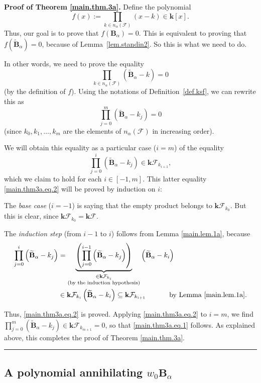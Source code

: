 \documentclass[12pt]{article}
\theoremstyle{definition}%
\theoremstyle{definition}%
\theoremstyle{remark}%
\newcommand{\tup}[1]{\left( #1 \right)}
\newcommand{\sbr}[1]{\left[ #1 \right]} %
\newcommand{\interval}[1]{\left[ #1 \right]} %
\newcommand{\kk}{\mathbf{k}}
\newcommand{\kf}{\kk\mathcal{F}}
\newcommand{\BBa}{\mathbf{B}_{\alpha}}
\newcommand{\BBta}{\widetilde{\mathbf{B}}_{\alpha}}
\newcommand{\CF}{\mathcal{F}}
\newcommand{\wo}{w_0} %
\newcommand{\na}{n_{ \alpha } }%
\newenvironment{proof}[1][Proof]{\noindent\textbf{#1.} }{\ \rule{0.5em}{0.5em}}
\begin{document}
\begin{proof}[Proof of Theorem \ref{main.thm.3a}]
Define the polynomial
\[
f\tup{x}
:= \prod_{k \in \na\tup{\CF}} \tup{x - k}
\in \kk\sbr{x}.
\]
Thus, our goal is to prove that $f\tup{\BBa} = 0$.
This is
equivalent to proving that $f\tup{\BBta} = 0$,
because of Lemma~\ref{lem.standin2}.
So this is what we need to do.

In other words, we need to prove the equality
\[
\prod_{k \in \na\tup{\CF}} \tup{\BBta - k} = 0
\]
(by the definition of $f$).
Using the notations of Definition~\ref{def.ksf}, we can rewrite this as
\begin{equation}
\prod_{j=0}^{m}
\tup{ \BBta-k_{j} }
= 0
\label{main.thm3a.eq.1}
\end{equation}
(since $k_0, k_1, \ldots, k_m$ are the elements of $\na\tup{\CF}$ in increasing order).

We will obtain this equality as a particular case ($i=m$) of the equality
\begin{equation}
\prod_{j=0}^{i} \tup{\BBta - k_j}
\in \kf_{k_{i+1}},
\label{main.thm3a.eq.2}
\end{equation}
which we claim to hold for each $i\in \interval{-1,m}$.
This latter equality \eqref{main.thm3a.eq.2} will be proved by induction
on $i$:

The \textit{base case} ($i=-1$) is saying that the
empty product belongs to $\kf_{k_0}$. But this is clear,
since $\kf_{k_0} = \kf$.

The \textit{induction step} (from $i-1$ to $i$) follows from Lemma
\ref{main.lem.1a}, because
\begin{align*}
\prod_{j=0}^{i} \tup{\BBta - k_j}
& = \underbrace{\tup{ \prod_{j=0}^{i-1}
\tup{ \BBta - k_j } }  }_{\substack{\in
\kf_{k_i}\\\text{(by the induction hypothesis)}}}
\tup{ \BBta - k_i }  \\
& \in \kf_{k_i} \tup{\BBta - k_i}
\subseteq \kf_{k_{i+1}}
\ \ \ \ \ \ \ \ \ \ \text{by Lemma \ref{main.lem.1a}.}
\end{align*}


Thus, \eqref{main.thm3a.eq.2} is proved.
Applying \eqref{main.thm3a.eq.2} to $i=m$,
we find
$\prod_{j=0}^m \tup{\BBta - k_j}
\in \kf_{k_{m+1}} = 0$,
so that
\eqref{main.thm3a.eq.1} follows.
As explained above, this completes the proof of
Theorem \ref{main.thm.3a}.
\end{proof}

\subsection{A polynomial annihilating $\wo \BBa$}
\end{document}
